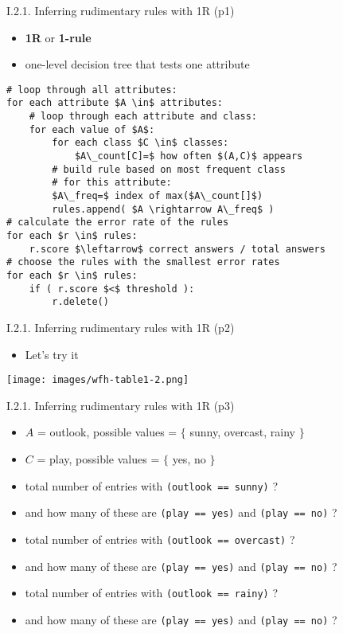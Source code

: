 \documentclass[handout]{beamer}
\newcommand{\stronger}[1]{\textbf{\color{purple} #1}}
\begin{document}
\begin{frame}[fragile]{I.2.1. Inferring rudimentary rules with 1R (p1)}
\begin{itemize}
\item[] \stronger{1R} or \stronger{1-rule}
\item one-level decision tree that tests one attribute 
\end{itemize}
\begin{center}
\begin{lstlisting}
# loop through all attributes:
for each attribute $A \in$ attributes:
	# loop through each attribute and class:
	for each value of $A$:
		for each class $C \in$ classes:
			$A\_count[C]=$ how often $(A,C)$ appears
		# build rule based on most frequent class
		# for this attribute:
		$A\_freq=$ index of max($A\_count[]$) 
		rules.append( $A \rightarrow A\_freq$ )
# calculate the error rate of the rules
for each $r \in$ rules:
	r.score $\leftarrow$ correct answers / total answers
# choose the rules with the smallest error rates
for each $r \in$ rules:
	if ( r.score $<$ threshold ):
		r.delete()
\end{lstlisting}
\end{center}
\end{frame}
\begin{frame}{I.2.1. Inferring rudimentary rules with 1R (p2)}
\begin{itemize}
\item Let's try it
\end{itemize}
\begin{center}
\texttt{[image: images/wfh-table1-2.png]}\\
\cite[Table 1.2]{WFH3:2011}
\end{center}
\end{frame}
\begin{frame}{I.2.1. Inferring rudimentary rules with 1R (p3)}
\begin{itemize}
\item $A$ = outlook, possible values = $\{$ sunny, overcast, rainy $\}$
\item[] $C$ = play, possible values = $\{$ yes, no $\}$
\item total number of entries with \lstinline+(outlook == sunny)+ ?
\item[] and how many of these are \lstinline+(play == yes)+ and \lstinline+(play == no)+ ?
\item total number of entries with \lstinline+(outlook == overcast)+ ?
\item[] and how many of these are \lstinline+(play == yes)+ and \lstinline+(play == no)+ ?
\item total number of entries with \lstinline+(outlook == rainy)+ ?
\item[] and how many of these are \lstinline+(play == yes)+ and \lstinline+(play == no)+ ?
\end{itemize}
\end{frame}
\end{document}
